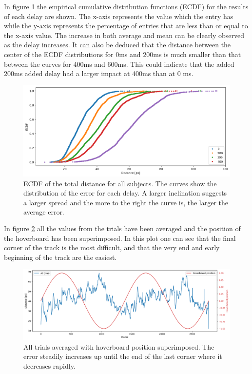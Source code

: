 \documentclass[nofilelist]{cslthse-msc}
\begin{document}
In figure \ref{fig:ecdf} the empirical cumulative distribution functions (ECDF) for the results of each delay are shown. The x-axis represents the value which the entry has while the y-axis represents the percentage of entries that are less than or equal to the x-axis value. The increase in both average and mean can be clearly observed as the delay increases. It can also be deduced that the distance between the center of the ECDF distributions for 0ms and 200ms is much smaller than that between the curves for 400ms and 600ms. This could indicate that the added 200ms added delay had a larger impact at 400ms than at 0 ms.

\begin{figure}[!hbt]
   \centering
   \includegraphics[scale=0.5]{images/ecdf.png} 
   \caption{ECDF of the total distance for all subjects. The curves show the distribution of the error for each delay. A larger inclination suggests a larger spread and the more to the right the curve is, the larger the average error.}
   \label{fig:ecdf}
\end{figure}

In figure \ref{fig:hoverboard-pos} all the values from the trials have been averaged and the position of the hoverboard has been superimposed. In this plot one can see that the final corner of the track is the most difficult, and that the very end and early beginning of the track are the easiest. 

\begin{figure}[!hbt]
   \centering
   \includegraphics[scale=0.4]{images/hoverboard-pos.png} 
   \caption{All trials averaged with hoverboard position superimposed. The error steadily increases up until the end of the last corner where it decreases rapidly.}
   \label{fig:hoverboard-pos}
\end{figure}
\end{document}

